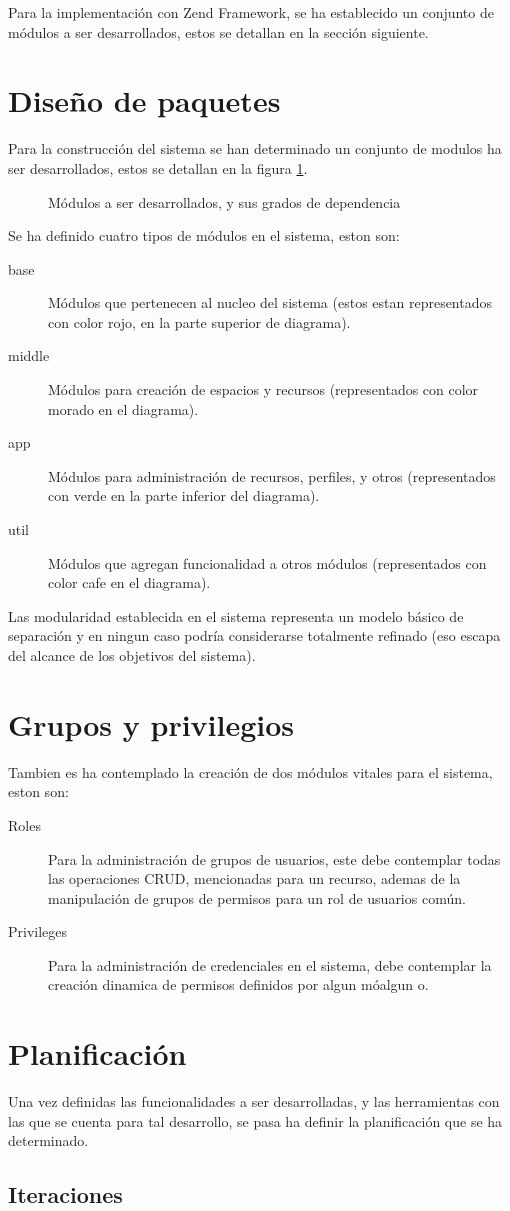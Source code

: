 Para la implementación con Zend Framework, se ha establecido un conjunto de
módulos a ser desarrollados, estos se detallan en la sección siguiente.

\section{Diseño de paquetes}

Para la construcción del sistema se han determinado un conjunto de modulos ha
ser desarrollados, estos se detallan en la figura \ref{paquetes}.

\begin{figure}
\centering

\caption{Módulos a ser desarrollados, y sus grados de dependencia}
\label{paquetes}
\end{figure}

Se ha definido cuatro tipos de módulos en el sistema, eston son:

\begin{description}
\item [base] Módulos que pertenecen al nucleo del sistema (estos estan
representados con color rojo, en la parte superior de diagrama).
\item [middle] Módulos para creación de espacios y recursos (representados con
color morado en el diagrama).
\item [app] Módulos para administración de recursos, perfiles, y otros
(representados con verde en la parte inferior del diagrama).
\item [util] Módulos que agregan funcionalidad a otros módulos (representados
con color cafe en el diagrama).
\end{description}

Las modularidad establecida en el sistema representa un modelo básico de
separación y en ningun caso podría considerarse totalmente refinado (eso escapa
del alcance de los objetivos del sistema).

\section{Grupos y privilegios}

Tambien es ha contemplado la creación de dos módulos vitales para el sistema,
eston son:

\begin{description}
\item [Roles] Para la administración de grupos de usuarios, este debe contemplar
todas las operaciones CRUD, mencionadas para un recurso, ademas de la
manipulación de grupos de permisos para un rol de usuarios común.
\item [Privileges] Para la administración de credenciales en el sistema, debe
contemplar la creación dinamica de permisos definidos por algun móalgun o.
\end{description}

\section{Planificación}

Una vez definidas las funcionalidades a ser desarrolladas, y las herramientas
con las que se cuenta para tal desarrollo, se pasa ha definir la planificación
que se ha determinado.

\subsection{Iteraciones}

